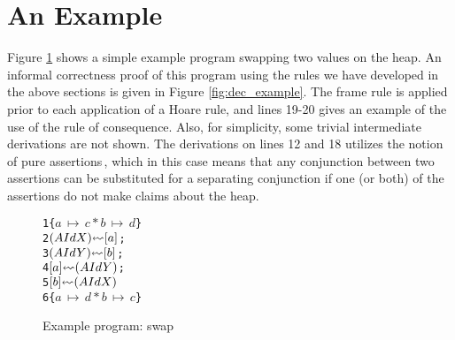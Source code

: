\section{An Example}
\label{sec:ex}
Figure \ref{fig:example} shows a simple example program swapping two values on the heap. An informal correctness proof of this program using the rules we have developed in the above sections is given in Figure \ref{fig:dec_example}. The frame rule is applied prior to each application of a Hoare rule, and lines 19-20 gives an example of the use of the rule of consequence. Also, for simplicity, some trivial intermediate derivations are not shown. The derivations on lines 12 and 18 utilizes the notion of pure assertions\,\cite{reynolds2008AnIntroductionTo}, which in this case means that any conjunction between two assertions can be substituted for a separating conjunction if one (or both) of the assertions do not make claims about the heap.
\begin{figure}
\begin{alltt}
                        1  \{\( a\,\mapsto\,c * b\,\mapsto\,d \)\}
                        2     \((AId X) \lsquigarr [ a ]\);
                        3     \((AId Y) \lsquigarr [ b ]\);
                        4     \([ a ] \lsquigarr (AId Y)\);
                        5     \([ b ] \lsquigarr (AId X)\)
                        6  \{\({ a\,\mapsto\,d * b\,\mapsto\,c }\)\}
\end{alltt}
\caption{Example program: swap}
\label{fig:example}
\end{figure}

